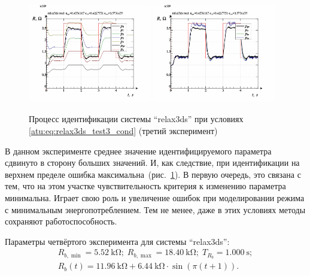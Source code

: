 \begin{figure}[htb!]
  \centerline{
    \includegraphics[width=0.48\textwidth]{p/relax3ds_read_id2_2-p_p.png}
    \hfill
    \includegraphics[width=0.48\textwidth]{p/relax3ds_read_id2_2-p_pp.png}
  }
  \caption{Процесс идентификации системы ``relax3ds'' при условиях \ref{atu:eq:relax3ds_test3_cond} (третий эксперимент)}
  \label{atu:f:relax3ds_id_2}
\end{figure}

В данном эксперименте среднее значение идентифицируемого параметра
сдвинуто в сторону больших значений. И, как следствие,
при идентификации на верхнем пределе ошибка максимальна~(рис.~\ref{atu:f:relax3ds_id_2}).
В первую очередь, это связана с тем, что на этом участке
чувствительность критерия к изменению параметра минимальна.
Играет свою роль и увеличение ошибок при моделировании
режима с минимальным энергопотреблением.
Тем не менее, даже в этих условиях методы сохраняют работоспособность.


Параметры четвёртого эксперимента для системы ``relax3ds'':
%
\begin{equation}
  \begin{array}{c}
    R_{b,\min} = \SI{5.52}{\kilo\ohm};
    \;
    R_{b,\max} = \SI{18.40}{\kilo\ohm};
    \;
    T_{R_b} = \SI{1.000}{\second};
  \\
    R_b(t) = \SI{11.96}{\kilo\ohm} + \SI{6.44}{\kilo\ohm} \cdot \sin( \pi ( t + 1 ) ).
  \end{array}
  \label{atu:eq:relax3ds_test4_cond}
\end{equation}

